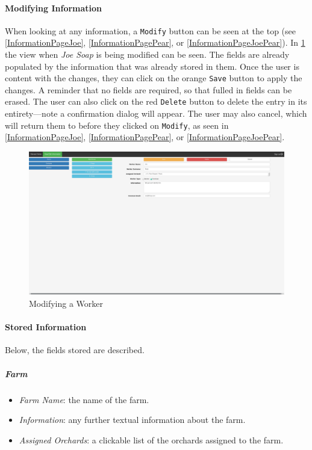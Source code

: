 \documentclass[11pt]{article}
\begin{document}
\paragraph{Modifying Information}When looking at any information, a \texttt{Modify} button can be seen at the top (see \ref{InformationPageJoe}, \ref{InformationPagePear}, or \ref{InformationPageJoePear}). In \ref{InformationModJoe} the view when \textit{Joe Soap} is being modified can be seen. The fields are already populated by the information that was already stored in them. Once the user is content with the changes, they can click on the orange \texttt{Save} button to apply the changes. A reminder that no fields are required, so that fulled in fields can be erased. The user can also click on the red \texttt{Delete} button to delete the entry in its entirety---note a confirmation dialog will appear. The user may also cancel, which will return them to before they clicked on \texttt{Modify}, as seen in \ref{InformationPageJoe}, \ref{InformationPagePear}, or \ref{InformationPageJoePear}.

\begin{figure}
 \centering
 \includegraphics[width=12cm, keepaspectratio]{Images/webInformation-Mod-Worker.png}
 \caption{Modifying a Worker}
 \label{InformationModJoe}
\end{figure}

\paragraph{Stored Information}
Below, the fields stored are described.
\subparagraph{Farm}
\begin{itemize}
 \item \textit{Farm Name}: the name of the farm.
 \item \textit{Information}: any further textual information about the farm.
 \item \textit{Assigned Orchards}: a clickable list of the orchards assigned to the farm.
\end{itemize}
\end{document}
